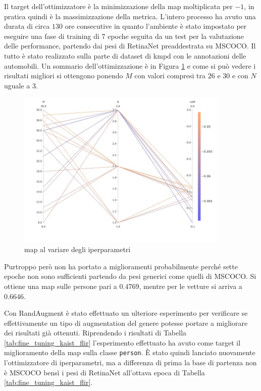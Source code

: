 Il target dell'ottimizzatore è la minimizzazione della \ac{map} moltiplicata per $-1$, in pratica quindi è la massimizzazione della metrica. L'intero processo ha avuto una durata di circa $130$ ore consecutive in quanto l'ambiente è stato impostato per eseguire una fase di training di $7$ epoche seguita da un test per la valutazione delle performance, partendo dai pesi di RetinaNet preaddestrata su \ac{MSCOCO}. Il tutto è stato realizzato sulla parte di dataset di \ac{kmpd} con le annotazioni delle automobili. Un sommario dell'ottimizzazione è in Figura \ref{fig:map_comet_ml} e come si può vedere i risultati migliori si ottengono ponendo $M$ con valori compresi tra $26$ e $30$ e con $N$ uguale a $3$.
\begin{figure}[]
    \centering
    \includegraphics[width=0.9\textwidth]{images/graphic/mAP_comet.jpeg}
    \caption{\ac{map} al variare degli iperparametri}
    \label{fig:map_comet_ml}
\end{figure}

Purtroppo però non ha portato a miglioramenti probabilmente perché sette epoche non sono sufficienti partendo da pesi generici come quelli di \ac{MSCOCO}. Si ottiene una \ac{map} sulle persone pari a $0.4769$, mentre per le vetture si arriva a $0.6646$. 

Con RandAugment è stato effettuato un ulteriore esperimento per verificare se effettivamente un tipo di augmentation del genere potesse portare a migliorare dei risultati già ottenuti. Riprendendo i risultati di Tabella \ref{tab:fine_tuning_kaist_flir} l'esperimento effettuato ha avuto come target il miglioramento della \ac{map} sulla classe \texttt{person}. 
È stato quindi lanciato nuovamente l'ottimizzatore di iperparametri, ma a differenza di prima la base di partenza non è \ac{MSCOCO} bensì i pesi di RetinaNet all'ottava epoca di Tabella \ref{tab:fine_tuning_kaist_flir}. 

